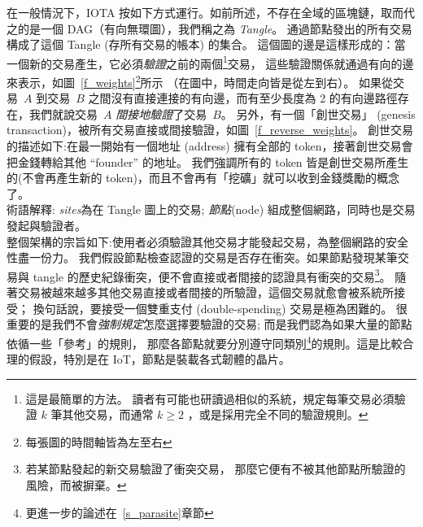\documentclass[12pt]{article}
\begin{document}
\begin{CJK}{UTF8}{bkai}
在一般情況下，IOTA 按如下方式運行。如前所述，不存在全域的區塊鏈，取而代之的是一個 DAG（有向無環圖），我們稱之為 \emph{Tangle}。
通過節點發出的所有交易構成了這個 Tangle (存所有交易的帳本) 的集合。
這個圖的邊是這樣形成的：當一個新的交易產生，它必須\emph{驗證}之前的兩個\footnote{這是最簡單的方法。
讀者有可能也研讀過相似的系統，規定每筆交易必須驗證 $k$ 筆其他交易，而通常 $k\geq 2$ ，或是採用完全不同的驗證規則。}交易，
這些驗證關係就通過有向的邊來表示，如圖~\ref{f_weights}\footnote{每張圖的時間軸皆為左至右}所示
（在圖中，時間走向皆是從左到右）。
如果從交易~$A$ 到交易~$B$ 之間沒有直接連接的有向邊，而有至少長度為 2 的有向邊路徑存在，我們就說交易~$A$ \emph{間接地驗證}了交易~$B$。
另外，有一個「創世交易」 (genesis transaction)，被所有交易直接或間接驗證，如圖~\ref{f_reverse_weights}。
創世交易的描述如下:在最一開始有一個地址 (address) 擁有全部的 token，接著創世交易會把金錢轉給其他 ``founder'' 的地址。
我們強調所有的 token 皆是創世交易所產生的(不會再產生新的 token)，而且不會再有「挖礦」就可以收到金錢獎勵的概念了。\leavevmode\\
術語解釋: \emph{sites}為在 Tangle 圖上的交易;
\emph{節點}(node) 組成整個網路，同時也是交易發起與驗證者。\leavevmode\\
整個架構的宗旨如下:使用者必須驗證其他交易才能發起交易，為整個網路的安全性盡一份力。
我們假設節點檢查認證的交易是否存在衝突。如果節點發現某筆交易與 tangle 的歷史紀錄衝突，便不會直接或者間接的認證具有衝突的交易\footnote{若某節點發起的新交易驗證了衝突交易，
那麼它便有不被其他節點所驗證的風險，而被摒棄。}。
隨著交易被越來越多其他交易直接或者間接的所驗證，這個交易就愈會被系統所接受；
換句話說，要接受一個雙重支付 (double-spending) 交易是極為困難的。
很重要的是我們不會\emph{強制規定}怎麼選擇要驗證的交易;
而是我們認為如果大量的節點依循一些「參考」的規則，
那麼各節點就要分別遵守同類別\footnote{更進一步的論述在~\ref{s_parasite}章節}的規則。這是比較合理的假設，特別是在 IoT，節點是裝載各式韌體的晶片。\leavevmode\\


\end{CJK}
\end{document}
